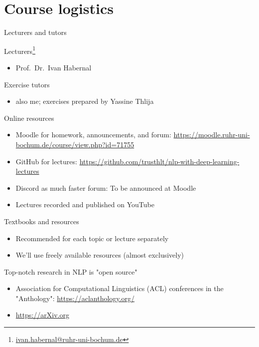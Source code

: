\documentclass[12pt,aspectratio=169,handout]{beamer}
\begin{document}
\section{Course logistics}


\begin{frame}{Lecturers and tutors}

Lecturers\footnote{\url{ivan.habernal@ruhr-uni-bochum.de}}

\begin{itemize}
	\item Prof.\ Dr.\ Ivan Habernal
\end{itemize}

Exercise tutors

\begin{itemize}
	\item also me; exercises prepared by Yassine Thlija
\end{itemize}

\end{frame}



\begin{frame}{Online resources}
	
\begin{itemize}
	\item Moodle for homework, announcements, and forum: \url{https://moodle.ruhr-uni-bochum.de/course/view.php?id=71755}
	\item GitHub for lectures: \url{https://github.com/trusthlt/nlp-with-deep-learning-lectures}
	\item Discord as much faster forum: To be announced at Moodle
	\item Lectures recorded and published on YouTube
\end{itemize}
	
\end{frame}

\begin{frame}{Textbooks and resources}
	
\begin{itemize}
	\item Recommended for each topic or lecture separately
	\item We'll use freely available resources (almost exclusively)
\end{itemize}

Top-notch research in NLP is "open source"

\begin{itemize}
	\item Association for Computational Linguistics (ACL) conferences in the "Anthology": \url{https://aclanthology.org/}
	\item \url{https://arXiv.org}
\end{itemize}
	
\end{frame}
\end{document}

